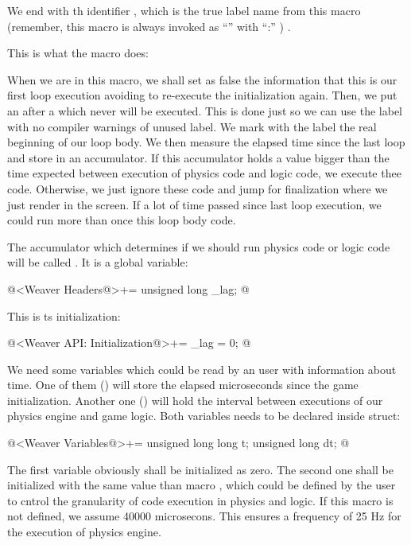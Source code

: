 We end with th identifier ,
which is the true label name from this macro (remember, this macro is
always invoked as ``'' with ``:'' )  .

     
This is what the macro  does:

When we are in this macro, we shall set as false the information that
this is our first loop execution avoiding to re-execute the
initialization again. Then, we put an  after
a  which never will be executed. This is done just so
we can use the label  with
no compiler warnings of unused label. We mark with the
label  the real beginning of
our loop body. We then measure the elapsed time since the last loop
and store in an accumulator. If this accumulator holds a value bigger
than the time expected between execution of physics code and logic
code, we execute thee code. Otherwise, we just ignore these code and
jump for finalization where we just render in the screen. If a lot of
time passed since last loop execution, we could run more than once
this loop body code.

The accumulator which determines if we should run physics code or
logic code will be called . It is a global variable:

\iniciocodigo
@<Weaver Headers@>+=
unsigned long _lag;
@
\fimcodigo

This is ts initialization:

@<Weaver API: Initialization@>+=
_lag = 0;
@

We need some variables which could be read by an user with information
about time. One of them () will store the elapsed
microseconds since the game initialization. Another one
() will hold the interval between executions of our
physics engine and game logic. Both variables needs to be declared
inside  struct:

\iniciocodigo
@<Weaver Variables@>+=
unsigned long long t;
unsigned long dt;
@
\fimcodigo

The first variable obviously shall be initialized as zero.  The second
one shall be initialized with the same value than
macro , which could be defined by the user to
cntrol the granularity of code execution in physics and logic. If this
macro is not defined, we assume 40000 microsecons. This ensures a
frequency of 25 Hz for the execution of physics engine.

